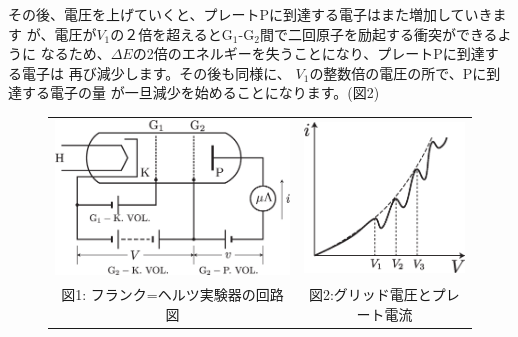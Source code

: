 その後、電圧を上げていくと、プレートPに到達する電子はまた増加していきます
が、電圧が$V_1$の２倍を超えると$\text{G}_1$-$\text{G}_2$間で二回原子を励起する衝突ができるように
なるため、$\Delta E$の2倍のエネルギーを失うことになり、プレートPに到達する電子は
再び減少します。その後も同様に、 $V_1$の整数倍の電圧の所で、Pに到達する電子の量
が一旦減少を始めることになります。(図2)

\begin{figure}[t]
\begin{tabular}{cc}
\includegraphics[scale=0.35]{13_FranckHertz/franckhertz.eps} & \includegraphics[scale=0.63]{13_FranckHertz/plot.eps}\\
図1: フランク=ヘルツ実験器の回路図 & 図2:グリッド電圧とプレート電流
\end{tabular}
\end{figure}


